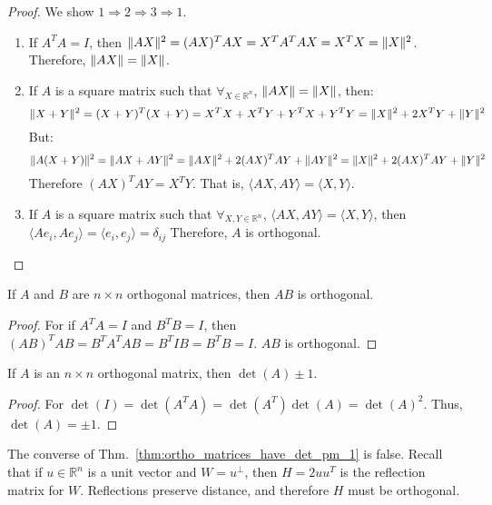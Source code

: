     \begin{proof}
    We show $1\Rightarrow 2 \Rightarrow 3 \Rightarrow 1$.
    \begin{enumerate}
        \item If $A^TA = I$, then $\lVert AX\rVert^{2}=(AX)^{T}AX=X^{T}A^{T}AX=X^{T}X=\lVert X\rVert^{2}$. Therefore, $\lVert AX\rVert=\lVert X\rVert$.
        \item If $A$ is a square matrix such that $\forall_{X\in\mathbb{R}^{n}}$, $\lVert AX\rVert = \lVert X\rVert$, then:
        \begin{equation*}
            \lVert X+Y\rVert^{2}=(X+Y)^T(X+Y)=X^TX+X^TY+Y^TX+Y^TY=\lVert X\rVert^2+2X^TY+\lVert Y\rVert^2
        \end{equation*}
        But:
        \begin{equation*}
            \lVert A(X+Y)\rVert^{2}=\lVert AX+AY\rVert^{2}=\lVert AX\rVert^{2}+2(AX)^{T}AY+\lVert AY\rVert^2=\lVert X\rVert^{2}+2(AX)^{T}AY+\lVert Y\rVert^2
        \end{equation*}
        Therefore $(AX)^TAY = X^TY$. That is, $\langle AX, AY\rangle = \langle X, Y\rangle$.
        \item If $A$ is a square matrix such that $\forall_{X,Y\in \mathbb{R}^n}$, $\langle AX, AY\rangle = \langle X, Y\rangle$, then $\langle Ae_{i}, Ae_{j}\rangle=\langle e_i,e_j\rangle=\delta_{ij}$
        Therefore, $A$ is orthogonal.
    \end{enumerate}
    \end{proof}
    \begin{theorem}
    If $A$ and $B$ are $n\times n$ orthogonal matrices, then $AB$ is orthogonal.
    \end{theorem}
    \begin{proof}
    For if $A^{T}A = I$ and $B^{T}B = I$, then $(AB)^{T}AB = B^{T}A^{T}AB = B^{T}IB = B^{T}B = I$. $AB$ is orthogonal.
    \end{proof}
    \begin{theorem}
    \label{thm:ortho_matrices_have_det_pm_1}%
    If $A$ is an $n\times{n}$ orthogonal matrix, then $\det(A)\pm{1}$.
    \end{theorem}
    \begin{proof}
    For $\det(I) = \det(A^TA) = \det(A^T)\det(A) = \det(A)^2$. Thus, $\det(A) = \pm 1$.
    \end{proof}
    The converse of Thm.~\ref{thm:ortho_matrices_have_det_pm_1} is false.
    Recall that if $u\in\mathbb{R}^{n}$ is a unit vector and $W=u^{\perp}$,
    then $H=2uu^{T}$ is the reflection matrix for $W$. Reflections preserve
    distance, and therefore $H$ must be orthogonal.
